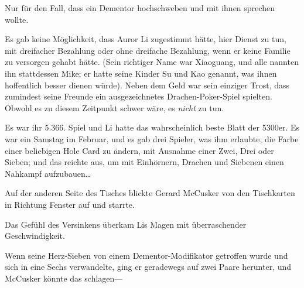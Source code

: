 Nur für den Fall, dass ein Dementor hochschweben und mit ihnen sprechen wollte.

Es gab keine Möglichkeit, dass Auror Li zugestimmt hätte, hier Dienst zu tun, mit dreifacher Bezahlung oder ohne dreifache Bezahlung, wenn er keine Familie zu versorgen gehabt hätte. (Sein richtiger Name war Xiaoguang, und alle nannten ihn stattdessen Mike; er hatte seine Kinder Su und Kao genannt, was ihnen hoffentlich besser dienen würde). Neben dem Geld war sein einziger Trost, dass zumindest seine Freunde ein ausgezeichnetes Drachen-Poker-Spiel spielten. Obwohl es zu diesem Zeitpunkt schwer wäre, es \emph{nicht} zu tun.

Es war ihr 5.366. Spiel und Li hatte das wahrscheinlich beste Blatt der 5300er. Es war ein Samstag im Februar, und es gab drei Spieler, was ihm erlaubte, die Farbe einer beliebigen Hole Card zu ändern, mit Ausnahme einer Zwei, Drei oder Sieben; und das reichte aus, um mit Einhörnern, Drachen und Siebenen einen Nahkampf aufzubauen…

Auf der anderen Seite des Tisches blickte Gerard McCusker von den Tischkarten in Richtung Fenster auf und starrte.

Das Gefühl des Versinkens überkam Lis Magen mit überraschender Geschwindigkeit.

Wenn seine Herz-Sieben von einem Dementor-Modifikator getroffen wurde und sich in eine Sechs verwandelte, ging er geradewegs auf zwei Paare herunter, und McCusker könnte das schlagen—


